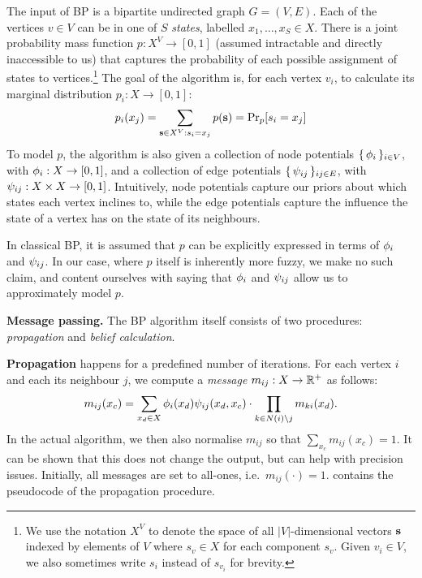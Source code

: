 \documentclass[final,letterpaper]{article}
\newcommand{\mypar}[1]{{\bf #1.}}
\newcommand{\myparcont}[1]{{\bf #1}}
\begin{document}
The input of BP is a bipartite undirected graph $G = (V, E)$. Each of the
vertices $v\in V$ can be in one of $S$ \emph{states}, labelled $x_1, \ldots,
x_S \in X$. There is a joint probability mass function $p: X^V \to [0, 1]$
(assumed intractable and directly inaccessible to us) that captures the probability of
each possible assignment of states to vertices.\footnote{We use the notation
$X^V$ to denote the space of all $|V|$-dimensional vectors $\ves$ indexed by
elements of $V$ where $s_v\in X$ for each component $s_v$. Given $v_i \in V$, we
also sometimes write $s_i$ instead of $s_{v_i}$ for brevity.} The goal of the
algorithm is, for each vertex $v_i$, to calculate its marginal distribution
$p_i: X \to [0, 1]$:
%
$$p_i(x_j) = \sum_{\ves \in X^V: s_i = x_j} p(\ves) = \Pr_p[s_i = x_j]$$
%
To model $p$, the algorithm is also given a collection of node potentials
$\{\,\phi_i\,\}_{i \in V}$, with $\phi_i: X \to [0, 1]$, and a collection of edge
potentials $\{\,\psi_{ij}\,\}_{ij \in E}$, with $\psi_{ij}: X\times X \to [0, 1]$.
Intuitively, node potentials capture our priors about which states each vertex
inclines to, while the edge potentials capture the influence the state of a
vertex has on the state of its neighbours.

In classical BP, it is assumed that $p$ can be explicitly expressed in terms of
$\phi_i$ and $\psi_{ij}$. In our case, where $p$ itself is inherently more
fuzzy, we make no such claim, and content ourselves with saying that $\phi_i$
and $\psi_{ij}$ allow us to approximately model $p$.

\mypar{Message passing} The BP algorithm itself consists of two
procedures: \emph{propagation} and \emph{belief calculation}.

\myparcont{Propagation} happens for a predefined number of iterations. For each vertex $i$ and each its neighbour $j$, we compute a \emph{message} $m_{ij} : X \to \mathbb{R}^+$ as follows:
%
$$m_{ij}(x_c) = \sum_{x_d \in X} \phi_i(x_d)\psi_{ij}(x_d, x_c) \cdot \prod_{k \in N(i) \setminus j} m_{ki}(x_d).$$
%
In the actual algorithm, we then also normalise $m_{ij}$ so that $\sum_{x_c}
m_{ij}(x_c) = 1$. It can be shown that this does not change the output, but can
help with precision issues. Initially, all messages are set to all-ones,
i.e.~$m_{ij}(\cdot) = 1$.
%
 contains the pseudocode of the propagation procedure.
\end{document}
